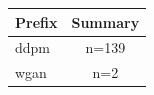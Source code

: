 \begin{tabular}{lc}
\toprule
Prefix & Summary \\
\midrule
ddpm & n=139 \\
wgan & n=2 \\
\bottomrule
\end{tabular}